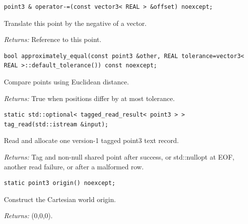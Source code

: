 \par\noindent\begin{minipage}{\linewidth}
\begin{lstlisting}[style=apireference]
point3 & operator-=(const vector3< REAL > &offset) noexcept;
\end{lstlisting}
{\footnotesize Translate this point by the negative of a vector.\par}
{\footnotesize\textit{Returns:} Reference to this point.\par}
\end{minipage}\par\vspace{1pt}
\par\noindent\begin{minipage}{\linewidth}
\begin{lstlisting}[style=apireference]
bool approximately_equal(const point3 &other, REAL tolerance=vector3< REAL >::default_tolerance()) const noexcept;
\end{lstlisting}
{\footnotesize Compare points using Euclidean distance.\par}
{\footnotesize\textit{Returns:} True when positions differ by at most tolerance.\par}
\end{minipage}\par\vspace{1pt}
\par\noindent\begin{minipage}{\linewidth}
\begin{lstlisting}[style=apireference]
static std::optional< tagged_read_result< point3 > > tag_read(std::istream &input);
\end{lstlisting}
{\footnotesize Read and allocate one version-1 tagged point3 text record.\par}
{\footnotesize\textit{Returns:} Tag and non-null shared point after success, or std::nullopt at EOF, another read failure, or after a malformed row.\par}
\end{minipage}\par\vspace{1pt}
\par\noindent\begin{minipage}{\linewidth}
\begin{lstlisting}[style=apireference]
static point3 origin() noexcept;
\end{lstlisting}
{\footnotesize Construct the Cartesian world origin.\par}
{\footnotesize\textit{Returns:} (0,0,0).\par}
\end{minipage}\par\vspace{1pt}
